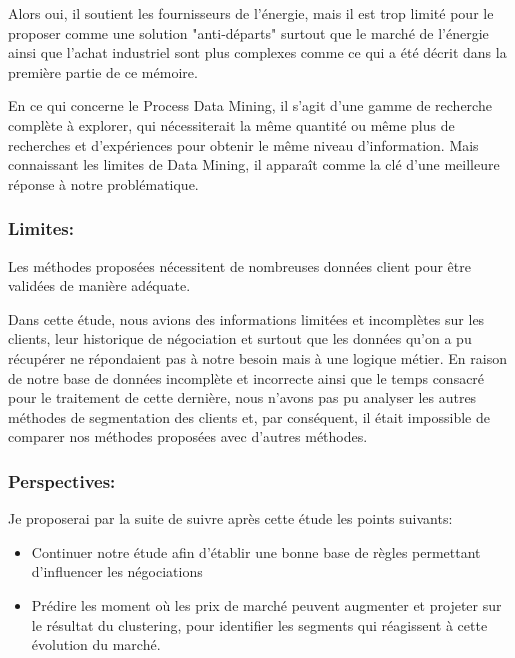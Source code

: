 \documentclass[12pt]{article}
\begin{document}
{Alors oui, il soutient les fournisseurs de l'énergie, mais il est trop limité pour le proposer comme une solution "anti-départs" surtout que le marché de l'énergie ainsi que l’achat industriel sont plus complexes comme ce qui a été décrit dans la première partie de ce mémoire.

En ce qui concerne le Process Data Mining, il s'agit d'une gamme de recherche complète à explorer, qui nécessiterait la même quantité ou même plus de recherches et d'expériences pour obtenir le même niveau d'information. Mais connaissant les limites de Data Mining, il apparaît comme la clé d'une meilleure réponse à notre problématique.


\subsubsection{Limites:}
Les méthodes proposées nécessitent de nombreuses données client pour être validées de manière adéquate.

Dans cette étude, nous avions des informations limitées et incomplètes sur les clients, leur historique de négociation et surtout que les données qu’on a pu récupérer ne répondaient pas à notre besoin mais à une logique métier.
En raison de notre base de données incomplète et incorrecte ainsi que le temps consacré pour le traitement de cette dernière, nous n'avons pas pu analyser les autres méthodes de segmentation des clients et, par conséquent, il était impossible de comparer nos méthodes proposées avec d'autres méthodes.


\subsubsection{Perspectives:}
Je proposerai par la suite de suivre après cette étude les points suivants:

\begin{itemize}
\item Continuer notre étude afin d'établir une bonne base de règles permettant d'influencer les négociations

\item Prédire les moment où les prix de marché peuvent augmenter et projeter sur le résultat du clustering, pour identifier les segments qui réagissent à cette évolution du marché.

\end{itemize}

\newpage
}
\end{document}
